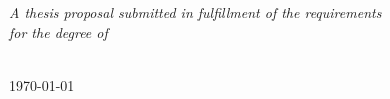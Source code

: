 \documentclass[
11pt, %
oneside, %
english, %
singlespacing, %
liststotoc, %
headsepline, %
]{MastersDoctoralThesis} %
\begin{document}
\begin{titlepage}
\begin{center}
\vfill

\large \textit{A thesis proposal submitted in fulfillment of the requirements \\for the degree of \degreename}\\[0.7cm] 

\deptname\\[2cm] %
 
\vfill

{\large \today}\\[4cm] %
 
\vfill
\end{center}
\end{titlepage}



 
 
\end{document}
